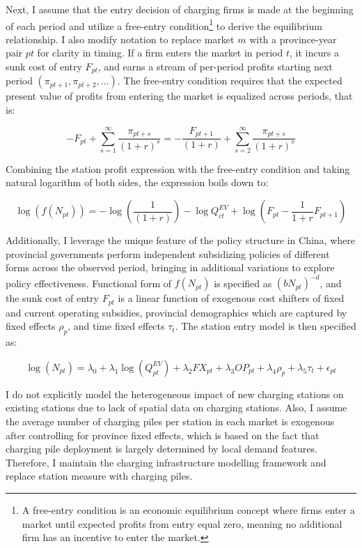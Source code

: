 \documentclass[12pt]{article}
\begin{document}
Next, I assume that the entry decision of charging firms is made at the beginning of each period and utilize a free-entry condition\footnote{A free-entry condition is an economic equilibrium concept where firms enter a market until expected profits from entry equal zero, meaning no additional firm has an incentive to enter the market.} to derive the equilibrium relationship. I also modify notation to replace market $m$ with a province-year pair $pt$ for clarity in timing.
If a firm enters the market in period $t$, it incurs a sunk cost of entry $F_{pt}$, and earns a stream of per-period profits starting next period $(\pi_{pt+1}, \pi_{pt+2}, ...)$. The free-entry condition requires that the expected present value of profits from entering the market is equalized across periods, that is:

\begin{equation}
    -F_{pt} + \sum_{s=1}^{\infty} \frac{\pi_{pt+s}}{(1 + r)^s} = - \frac{F_{pt+1}} {(1 + r)} + \sum_{s=2}^{\infty} \frac{\pi_{pt+s}}{(1 + r)^s}
\end{equation}

Combining the station profit expression with the free-entry condition and taking natural logarithm of both sides, the expression boils down to:

\begin{equation}
    \log(f(N_{pt})) = -\log(\frac{1}{(1 + r)})  - \log Q_{ct}^{EV} + \log(F_{pt} - \frac{1}{1 + r} F_{pt+1})
\end{equation}

Additionally, I leverage the unique feature of the policy structure in China, where provincial governments perform independent subsidizing policies of different forms across the observed period, 
bringing in additional variations to explore policy effectiveness. Functional form of $f(N_{pt})$ is specified as $(bN_{pt})^{-d}$, 
and the sunk cost of entry $F_{pt}$ is a linear function of exogenous cost shifters of fixed and current operating subsidies, 
provincial demographics which are captured by fixed effects $\rho_p$, and time fixed effects $\tau_{t}$. The station entry model is then specified as:

\begin{equation}
    \log(N_{pt}) = \lambda_0 + \lambda_1 \log(Q_{pt}^{EV}) + \lambda_2 FX_{pt} + \lambda_3 OP_{pt} + \lambda_4 \rho_p + \lambda_5 \tau_t + \epsilon_{pt}
\end{equation}

I do not explicitly model the heterogeneous impact of new charging stations on existing stations due to lack of spatial data on charging stations.
Also, I assume the average number of charging piles per station in each market is exogenous after controlling for province fixed effects,
which is based on the fact that charging pile deployment is largely determined by local demand features. 
Therefore, I maintain the charging infrastructure modelling framework and replace station measure with charging piles.
\end{document}
